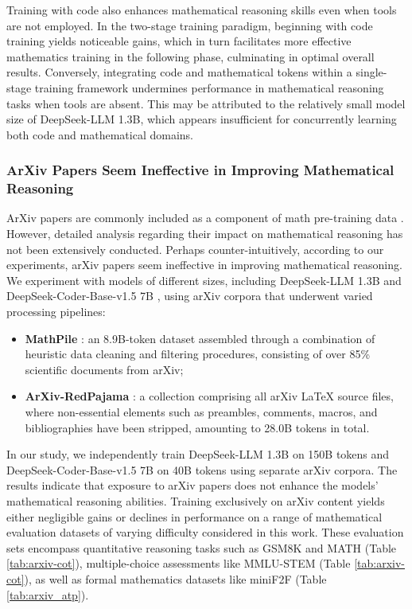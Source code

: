 \begin{itemize}[topsep=0pt]
\begin{itemize}[topsep=0pt]
Training with code also enhances mathematical reasoning skills even when tools are not employed. In the two-stage training paradigm, beginning with code training yields noticeable gains, which in turn facilitates more effective mathematics training in the following phase, culminating in optimal overall results. Conversely, integrating code and mathematical tokens within a single-stage training framework undermines performance in mathematical reasoning tasks when tools are absent. This may be attributed to the relatively small model size of DeepSeek-LLM 1.3B, which appears insufficient for concurrently learning both code and mathematical domains.

\subsubsection{ArXiv Papers Seem Ineffective in Improving Mathematical Reasoning}

ArXiv papers are commonly included as a component of math pre-training data \citep{minerva,gpt-f,llemma,mathpile}. However, detailed analysis regarding their impact on mathematical reasoning has not been extensively conducted. Perhaps counter-intuitively, according to our experiments, arXiv papers seem ineffective in improving mathematical reasoning. We experiment with models of different sizes, including DeepSeek-LLM 1.3B and DeepSeek-Coder-Base-v1.5 7B \citep{deepseek-coder}, using arXiv corpora that underwent varied processing pipelines:

\begin{itemize}[topsep=0pt]
    \item \textbf{MathPile} \citep{mathpile}: an 8.9B-token dataset assembled through a combination of heuristic data cleaning and filtering procedures, consisting of over 85\% scientific documents from arXiv;
    \item \textbf{ArXiv-RedPajama} \citep{redpajama}: a collection comprising all arXiv LaTeX source files, where non-essential elements such as preambles, comments, macros, and bibliographies have been stripped, amounting to 28.0B tokens in total.
\end{itemize}

In our study, we independently train DeepSeek-LLM 1.3B on 150B tokens and DeepSeek-Coder-Base-v1.5 7B on 40B tokens using separate arXiv corpora. The results indicate that exposure to arXiv papers does not enhance the models' mathematical reasoning abilities. Training exclusively on arXiv content yields either negligible gains or declines in performance on a range of mathematical evaluation datasets of varying difficulty considered in this work. These evaluation sets encompass quantitative reasoning tasks such as GSM8K and MATH (Table \ref{tab:arxiv-cot}), multiple-choice assessments like MMLU-STEM (Table \ref{tab:arxiv-cot}), as well as formal mathematics datasets like miniF2F (Table \ref{tab:arxiv_atp}).


\end{itemize}
\end{itemize}
